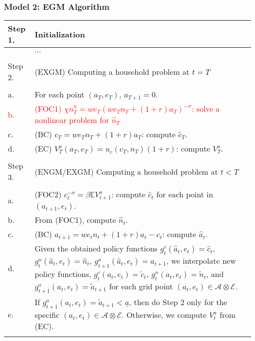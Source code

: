 \documentclass[xcolor=x11names,compress]{beamer}
\renewcommand{\(}{\begin{columns}}
\renewcommand{\)}{\end{columns}}
\newcommand{\<}[1]{\begin{column}{#1}}
\renewcommand{\>}{\end{column}}
\begin{document}
\begin{frame}
\frametitle{Model 2: EGM Algorithm}
\vspace{-0.7em}
\begin{center}
\footnotesize
\begin{tabular}{p{1cm} p{9cm}}
\hline
Step 1. & Initialization\\
\hline
\\[-0.8em]
& $\cdots$\\
\\[-0.8em]\hline
Step 2. &(EXGM) Computing a household problem at $t=T$\\
\hline
\\[-0.8em]
\hfill a.& For each point $(a_T, e_T)$, $a_{T+1}=0$.\\
\hfill \textcolor<2->{red}{b.}& \textcolor<2->{red}{(FOC1) $\chi n_T^{\eta} = w e_T (w e_T n_T + (1+r)a_T)^{-\sigma}$: solve a nonlinear problem for $\hat{n}_{T}$}\\
\hfill c.& (BC) $c_T = w e_T n_{T} + (1+r) a_T$: compute $\hat{c}_T$.\\
\hfill d.& (EC) $V^a_T(a_{T},e_T) = u_c(c_T,n_T)(1+r)$: compute $V^a_T$.\\
\\[-0.8em]\hline
Step 3. &(ENGM/EXGM) Computing a household problem at $t<T$\\
\hline
\\[-0.8em]
\hfill a.& (FOC2) $c_t^{-\sigma} = \beta \mathbb{E}V^a_{t+1}$: compute $\hat{c}_t$ for each point in $(a_{t+1},e_{t})$.\\
\hfill b.& From (FOC1), compute $\hat{n}_t$.\\
\hfill c.& (BC) $a_{t+1} = w e_t n_t + (1+r)a_t - c_t$: compute $\hat{a}_t$.\\
\hfill d.& Given the obtained policy functions $g^c_t(\hat{a}_t,e_t) = \hat{c}_t$, $g^n_t(\hat{a}_t,e_t) = \hat{n}_t$, $g^a_{t+1}(\hat{a}_t,e_t) = a_{t+1}$, we interpolate new policy functions, $g^c_{t}(a_t,e_t) = \tilde{c}_{t}$, $g^n_{t}(a_t,e_t) = \tilde{n}_{t}$, and $g^a_{t+1}(a_t,e_t) = \tilde{a}_{t+1}$ for each grid point $(a_t,e_t)\in \mathcal{A} \otimes \mathcal{E}$.\\
\hfill e.& If $g^a_{t+1}(a_t,e_t) = \tilde{a}_{t+1} < \underline{a}$, then do Step 2 only for the specific $(a_t,e_t)\in \mathcal{A} \otimes \mathcal{E}$. Otherwise, we compute $V^a_{t}$ from (EC).\\
\\[-0.8em]\hline
\end{tabular}
\end{center}
\end{frame}
\end{document}
